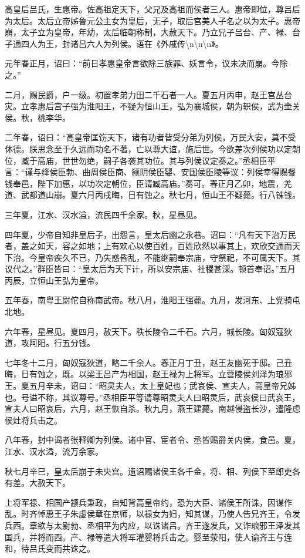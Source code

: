 \documentclass[]{article}
\begin{document}
高皇后吕氏，生惠帝。佐高祖定天下，父兄及高祖而侯者三人。惠帝即位，尊吕后为太后。太后立帝姊鲁元公主女为皇后，无子，取后宫美人子名之以为太子。惠帝崩，太子立为皇帝，年幼，太后临朝称制，大赦天下。乃立兄子吕台、产、禄、台子通四人为王，封诸吕六人为列侯。语在《外戚传\textbackslash{}n\textbackslash{}n\textbackslash{}n》。

元年春正月，诏曰：``前日孝惠皇帝言欲除三族罪、妖言令，议未决而崩。今除之。''

二月，赐民爵，户一级。初置孝弟力田二千石者一人。夏五月丙申，赵王宫丛台灾。立孝惠后宫子强为淮阳王，不疑为恒山王，弘为襄城侯，朝为轵侯，武为壶关侯。秋，桃李华。

二年春，诏曰：``高皇帝匡饬天下，诸有功者皆受分弟为列侯，万民大安，莫不受休德。朕思念至于久远而功名不著，亡以尊大谊，施后世。今欲差次列侯功以定朝位，臧于高庙，世世勿绝，嗣子各袭其功位。其与列侯议定奏之。''丞相臣平言：``谨与绛侯臣勃、曲周侯臣商、颍阴侯臣婴、安国侯臣陵等议：列侯幸得赐餐钱奉邑，陛下加惠，以功次定朝位，臣请臧高庙。''奏可。春正月乙卯，地震，羌道、武都道山崩。夏六月丙戌晦，日有蚀之。秋七月，恒山王不疑薨。行八铢钱。

三年夏，江水、汉水溢，流民四千余家。秋，星昼见。

四年夏，少帝自知非皇后子，出怨言，皇太后幽之永巷。诏曰：``凡有天下治万民者，盖之如天，容之如地；上有欢心以使百姓，百姓欣然以事其上，欢欣交通而天下治。今皇帝疾久不已，乃失惑昏乱，不能继嗣奉宗庙，守祭祀，不可属天下。其议代之。''群臣皆曰：``皇太后为天下计，所以安宗庙、社稷甚深。顿首奉诏。''五月丙辰，立恒山王弘为皇帝。

五年春，南粤王尉佗自称南武帝。秋八月，淮阳王强薨。九月，发河东、上党骑屯北地。

六年春，星昼见。夏四月，赦天下。秩长陵令二千石。六月，城长陵。匈奴寇狄道，攻阿阳。行五分钱。

七年冬十二月，匈奴寇狄道，略二千余人。春正月丁丑，赵王友幽死于邸。己丑晦，日有蚀之，既。以梁王吕产为相国，赵王禄为上将军。立营陵侯刘泽为琅邪王。夏五月辛未，诏曰：``昭灵夫人，太上皇妃也；武哀侯、宣夫人，高皇帝兄姊也。号谥不称，其议尊号。''丞相臣平等请尊昭灵夫人曰昭灵后，武哀侯曰武哀王，宣夫人曰昭哀后，六月，赵王恢自杀。秋九月，燕王建薨。南越侵盗长沙，遣隆虑侯灶将兵击之。

八年春，封中谒者张释卿为列侯。诸中官、宦者令、丞皆赐爵关内侯，食邑。夏，江水、汉水溢，流万余家。

秋七月辛巳，皇太后崩于未央宫。遗诏赐诸侯王各千金，将、相、列侯下至郎吏各有差。大赦天下。

上将军禄、相国产颛兵秉政，自知背高皇帝约，恐为大臣、诸侯王所诛，因谋作乱。时齐悼惠王子朱虚侯章在京师，以禄女为妇，知其谋，乃使人告兄齐王，令发兵西。章欲与太尉勃、丞相平为内应，以诛诸吕。齐王遂发兵，又诈琅邪王泽发其国兵，并将而西。产、禄等遣大将军灌婴将兵击之。婴至荥阳，使人谕齐王与连和，待吕氏变而共诛之。
\end{document}
